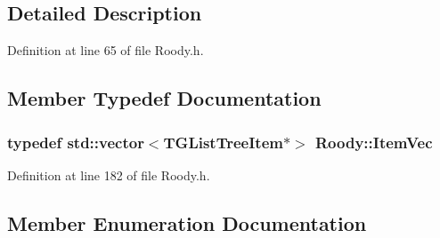 \subsection{Detailed Description}


Definition at line 65 of file Roody.h.

\subsection{Member Typedef Documentation}
\subsubsection[{ItemVec}]{\setlength{\rightskip}{0pt plus 5cm}typedef std::vector$<$TGListTreeItem$\ast$$>$ {\bf Roody::ItemVec}\hspace{0.3cm}{\ttfamily  [protected]}}\label{classRoody_a30e74959b7c8f262000dbdddb19a80bb}


Definition at line 182 of file Roody.h.

\subsection{Member Enumeration Documentation}
